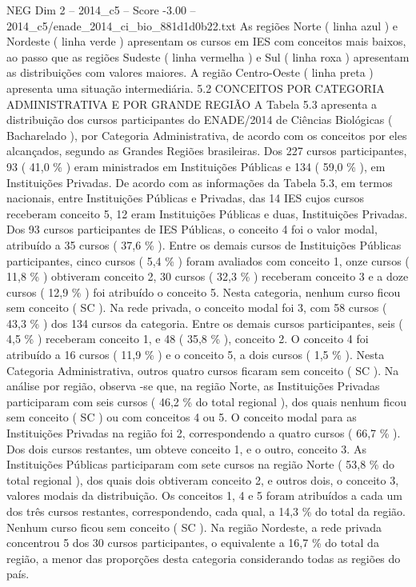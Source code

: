 \begin{textsample}{NEG Dim 2 – 2014\_c5 – Score -3.00 – 2014\_c5/enade\_2014\_ci\_bio\_881d1d0b22.txt}
As regiões Norte ( linha azul ) e Nordeste ( linha verde ) apresentam os cursos em IES com conceitos mais baixos, ao passo que as regiões Sudeste ( linha vermelha ) e Sul ( linha roxa ) apresentam as distribuições com valores maiores.
A região Centro-Oeste ( linha preta ) apresenta uma situação intermediária. 5.2 CONCEITOS POR CATEGORIA ADMINISTRATIVA E POR GRANDE REGIÃO A Tabela 5.3 apresenta a distribuição dos cursos participantes do ENADE/2014 de Ciências Biológicas ( Bacharelado ), por Categoria Administrativa, de acordo com os conceitos por eles alcançados, segundo as Grandes Regiões brasileiras.
Dos 227 cursos participantes, 93 ( 41,0 \% ) eram ministrados em Instituições Públicas e 134 ( 59,0 \% ), em Instituições Privadas.
De acordo com as informações da Tabela 5.3, em termos nacionais, entre Instituições Públicas e Privadas, das 14 IES cujos cursos receberam conceito 5, 12 eram Instituições Públicas e duas, Instituições Privadas.
Dos 93 cursos participantes de IES Públicas, o conceito 4 foi o valor modal, atribuído a 35 cursos ( 37,6 \% ).
Entre os demais cursos de Instituições Públicas participantes, cinco cursos ( 5,4 \% ) foram avaliados com conceito 1, onze cursos ( 11,8 \% ) obtiveram conceito 2, 30 cursos ( 32,3 \% ) receberam conceito 3 e a doze cursos ( 12,9 \% ) foi atribuído o conceito 5.
Nesta categoria, nenhum curso ficou sem conceito ( SC ).
Na rede privada, o conceito modal foi 3, com 58 cursos ( 43,3 \% ) dos 134 cursos da categoria.
Entre os demais cursos participantes, seis ( 4,5 \% ) receberam conceito 1, e 48 ( 35,8 \% ), conceito 2.
O conceito 4 foi atribuído a 16 cursos ( 11,9 \% ) e o conceito 5, a dois cursos ( 1,5 \% ).
Nesta Categoria Administrativa, outros quatro cursos ficaram sem conceito ( SC ).
Na análise por região, observa -se que, na região Norte, as Instituições Privadas participaram com seis cursos ( 46,2 \% do total regional ), dos quais nenhum ficou sem conceito ( SC ) ou com conceitos 4 ou 5.
O conceito modal para as Instituições Privadas na região foi 2, correspondendo a quatro cursos ( 66,7 \% ).
Dos dois cursos restantes, um obteve conceito 1, e o outro, conceito 3.
As Instituições Públicas participaram com sete cursos na região Norte ( 53,8 \% do total regional ), dos quais dois obtiveram conceito 2, e outros dois, o conceito 3, valores modais da distribuição.
Os conceitos 1, 4 e 5 foram atribuídos a cada um dos três cursos restantes, correspondendo, cada qual, a 14,3 \% do total da região.
Nenhum curso ficou sem conceito ( SC ).
Na região Nordeste, a rede privada concentrou 5 dos 30 cursos participantes, o equivalente a 16,7 \% do total da região, a menor das proporções desta categoria considerando todas as regiões do país.

\end{textsample}
